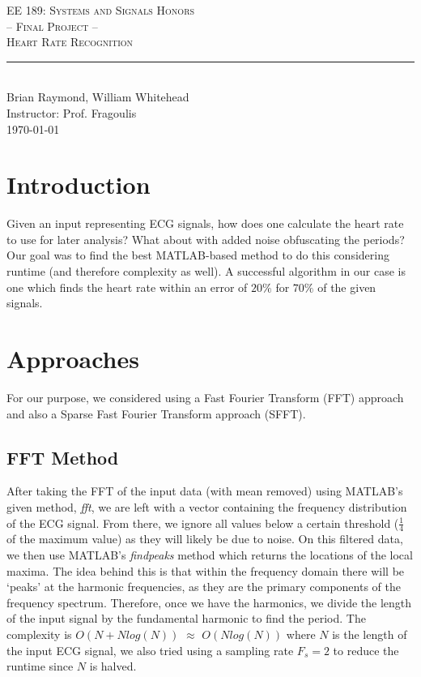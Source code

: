\documentclass[twocolumn]{article}
\newcommand{\rpm}{\raisebox{.2ex}{$\scriptstyle\pm$}}
\newcommand{\classname}{EE 189: Systems and Signals Honors}
\newcommand{\project}{-- Final Project -- \\ Heart Rate Recognition}
\newcommand{\authorname}{Brian Raymond, William Whitehead}
\newcommand{\instructor}{Prof. Fragoulis}
\begin{document}
		
	\begin{center}
		{\large \textsc{\classname \\ \project} \\ \vspace{4pt}}
		\rule[13pt]{\columnwidth}{1pt} \\ %
		{\authorname \\ \vspace{2pt}
			Instructor: \instructor \\ \vspace{2pt}
			\today \\
		}
	\end{center}	
	
	\begin{flushleft}

		\section{Introduction}
		Given an input representing ECG signals, how does one calculate the heart rate to use for later analysis? What about with added noise obfuscating the periods? Our goal was to find the best MATLAB-based method to do this considering runtime (and therefore complexity as well). A successful algorithm in our case is one which finds the heart rate within an error of \rpm$20\%$ for $70\%$ of the given signals. \\ \vspace{-1em}
		
		\section{Approaches}
		For our purpose, we considered using a Fast Fourier Transform (FFT) approach and also a Sparse Fast Fourier Transform approach (SFFT). \\ \vspace{-2em}
		
		\hspace{2em}\subsection{FFT Method}
		After taking the FFT of the input data (with mean removed) using MATLAB's given method, \textit{fft}, we are left with a vector containing the frequency distribution of the ECG signal. From there, we ignore all values below a certain threshold ($\frac{1}{4}$ of the maximum value) as they will likely be due to noise. On this filtered data, we then use MATLAB's \textit{findpeaks} method which returns the locations of the local maxima. The idea behind this is that within the frequency domain there will be `peaks' at the harmonic frequencies, as they are the primary components of the frequency spectrum. Therefore, once we have the harmonics, we divide the length of the input signal by the fundamental harmonic to find the period. The complexity is $O(N+Nlog(N))$ $\approx$ $O(Nlog(N))$ where $N$ is the length of the input ECG signal, we also tried using a sampling rate $F_{s}=2$ to reduce the runtime since $N$ is halved. \\ \vspace{-2em}
		

\end{flushleft}
\end{document}
